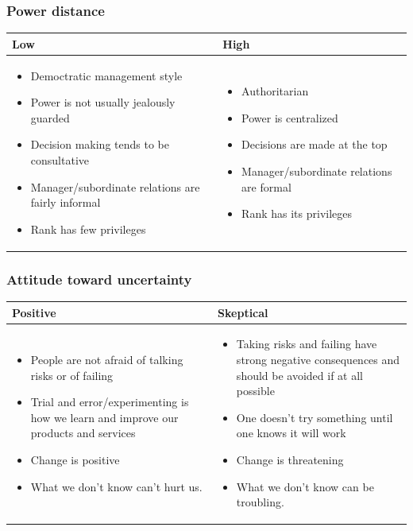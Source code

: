 \subsubsection{Power distance}
\begin{tabularx}{\textwidth}{X|X}
	\textbf{Low} & \textbf{High} \\ 
	\hline 
	\begin{itemize}
		\tightlist
		\item Democtratic management style
		\item Power is not usually jealously guarded
		\item Decision making tends to be consultative
		\item Manager/subordinate relations are fairly informal
		\item Rank has few privileges
	\end{itemize}
	&
	\begin{itemize}
		\tightlist
		\item Authoritarian
		\item Power is centralized
		\item Decisions are made at the top
		\item Manager/subordinate relations are formal
		\item Rank has its privileges
	\end{itemize} \\
\end{tabularx}


\subsubsection{Attitude toward uncertainty}
\begin{tabularx}{\textwidth}{X|X}
	\textbf{Positive} & \textbf{Skeptical} \\ 
	\hline 
	\begin{itemize}
		\tightlist
		\item People are not afraid of talking risks or of failing
		\item Trial and error/experimenting is how we learn and improve our products and services
		\item Change is positive
		\item What we don’t know can’t hurt us.
	\end{itemize}
	&
	\begin{itemize}
		\tightlist
		\item Taking risks and failing have strong negative consequences and should be avoided if at all possible
		\item One doesn’t try something until one knows it will work
		\item Change is threatening
		\item What we don’t know can be troubling.
	\end{itemize} \\
\end{tabularx}

